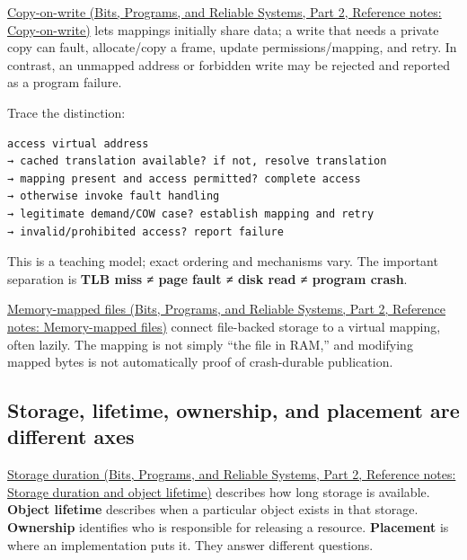 \href{../01-Bits-Programs-and-Reliable-Systems-P02/main.pdf\#nameddest=appendix-7a06e5baac04}{Copy-on-write (Bits, Programs, and Reliable Systems, Part 2, Reference notes: Copy-on-write)} lets mappings initially share data; a write that needs a private copy can fault, allocate/copy a frame, update permissions/mapping, and retry. In contrast, an unmapped address or forbidden write may be rejected and reported as a program failure.

Trace the distinction:

\begin{verbatim}
access virtual address
→ cached translation available? if not, resolve translation
→ mapping present and access permitted? complete access
→ otherwise invoke fault handling
→ legitimate demand/COW case? establish mapping and retry
→ invalid/prohibited access? report failure
\end{verbatim}

This is a teaching model; exact ordering and mechanisms vary. The important separation is \textbf{TLB miss ≠ page fault ≠ disk read ≠ program crash}.

\href{../01-Bits-Programs-and-Reliable-Systems-P02/main.pdf\#nameddest=appendix-313ee7a0ba7b}{Memory-mapped files (Bits, Programs, and Reliable Systems, Part 2, Reference notes: Memory-mapped files)} connect file-backed storage to a virtual mapping, often lazily. The mapping is not simply ``the file in RAM,'' and modifying mapped bytes is not automatically proof of crash-durable publication.

\subsection{Storage, lifetime, ownership, and placement are different axes}\label{05-engine-i-ch002-storage-lifetime-ownership-and-placement-are-different-axes}

\hypertarget{05-engine-i-ch002-storage-lifetime-ownership-and-placement-are-different-axes}{}

\href{../01-Bits-Programs-and-Reliable-Systems-P02/main.pdf\#nameddest=appendix-0b104bcba06b}{Storage duration (Bits, Programs, and Reliable Systems, Part 2, Reference notes: Storage duration and object lifetime)} describes how long storage is available. \textbf{Object lifetime} describes when a particular object exists in that storage. \textbf{Ownership} identifies who is responsible for releasing a resource. \textbf{Placement} is where an implementation puts it. They answer different questions.

